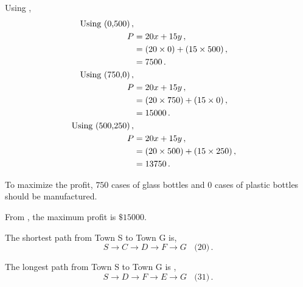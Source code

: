 \begin{subquestions}
\begin{subsubquestions}
\begin{subsubsubquestions}
\subsubsubquestion

Using ,
\begin{align}
	\text{Using (0,500)}\,, \nonumber \\
	P & = 20x + 15y\,, \nonumber \\
	  & = (20 \times 0) + (15 \times 500)\,, \nonumber \\
	  & = 7500\,. \\
	\text{Using (750,0)}\,, \nonumber \\
	P & = 20x + 15y\,, \nonumber \\
	  & = (20 \times 750) + (15 \times 0)\,, \nonumber \\
	  & = 15000\,. \label{2015:q1:eqn:Profit} \\	  
	\text{Using (500,250)}\,, \nonumber \\
	P & = 20x + 15y\,, \nonumber \\
	  & = (20 \times 500) + (15 \times250)\,, \nonumber \\
	  & = 13750\,.
\end{align}

To maximize the profit, $750$ cases of glass bottles and $0$ cases of plastic bottles should be manufactured.


\subsubsubquestion

From , the maximum profit is $\$ 15000$.

\end{subsubsubquestions}

\end{subsubquestions}


\subquestion

The shortest path from Town S to Town G is,
\begin{equation}
	S \rightarrow C \rightarrow D \rightarrow F \rightarrow G ~~~~\text{(20)} \,.
\end{equation}

The longest path from Town S to Town G is ,
\begin{equation}
	S \rightarrow D \rightarrow F \rightarrow E \rightarrow G ~~~~\text{(31)} \,.
\end{equation}

\end{subquestions}

